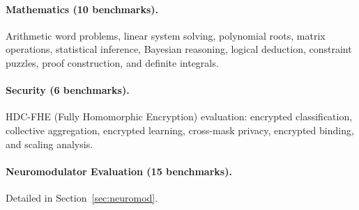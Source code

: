 \documentclass[11pt,letterpaper]{article}
\begin{document}
\paragraph{Mathematics (10 benchmarks).} Arithmetic word problems, linear system solving, polynomial roots, matrix operations, statistical inference, Bayesian reasoning, logical deduction, constraint puzzles, proof construction, and definite integrals.

\paragraph{Security (6 benchmarks).} HDC-FHE (Fully Homomorphic Encryption) evaluation: encrypted classification, collective aggregation, encrypted learning, cross-mask privacy, encrypted binding, and scaling analysis.

\paragraph{Neuromodulator Evaluation (15 benchmarks).} Detailed in Section~\ref{sec:neuromod}.
\end{document}
